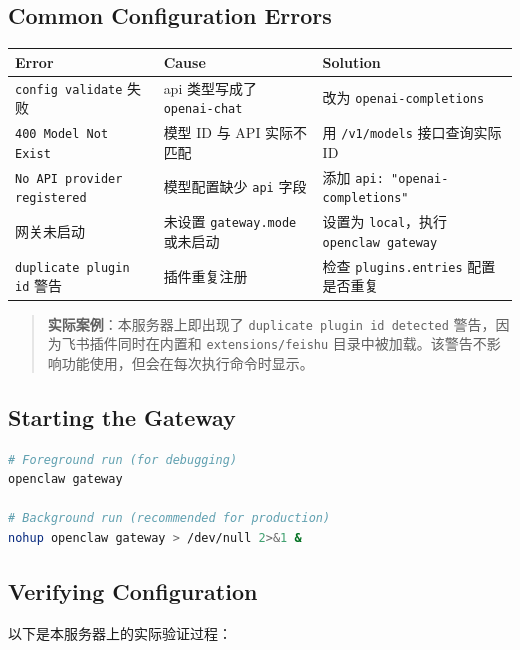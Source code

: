 \subsection{Common Configuration Errors}


\begin{table}[h]
\centering
\small
\begin{tabular}{|l|l|l|}
\hline
Error & Cause & Solution \\
\hline
\texttt{config validate} 失败 & api 类型写成了 \texttt{openai-chat} & 改为 \texttt{openai-completions} \\
\hline
\texttt{400 Model Not Exist} & 模型 ID 与 API 实际不匹配 & 用 \texttt{/v1/models} 接口查询实际 ID \\
\hline
\texttt{No API provider registered} & 模型配置缺少 \texttt{api} 字段 & 添加 \texttt{api: "openai-completions"} \\
\hline
网关未启动 & 未设置 \texttt{gateway.mode} 或未启动 & 设置为 \texttt{local}，执行 \texttt{openclaw gateway} \\
\hline
\texttt{duplicate plugin id} 警告 & 插件重复注册 & 检查 \texttt{plugins.entries} 配置是否重复 \\
\hline
\end{tabular}
\end{table}

\begin{quote}
\textbf{实际案例}：本服务器上即出现了 \texttt{duplicate plugin id detected} 警告，因为飞书插件同时在内置和 \texttt{extensions/feishu} 目录中被加载。该警告不影响功能使用，但会在每次执行命令时显示。
\end{quote}

\subsection{Starting the Gateway}


\begin{lstlisting}[language=bash]
# Foreground run (for debugging)
openclaw gateway

# Background run (recommended for production)
nohup openclaw gateway > /dev/null 2>&1 &
\end{lstlisting}

\subsection{Verifying Configuration}


以下是本服务器上的实际验证过程：

